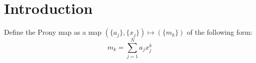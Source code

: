 \section{Introduction}
Define the Prony map as a map $(\{a_j\}, \{x_j\}) \mapsto (\{m_k\})$ of the following form:
$$
m_k = \sum_{j=1}^N a_j x_j^k
$$
  
  
  
  